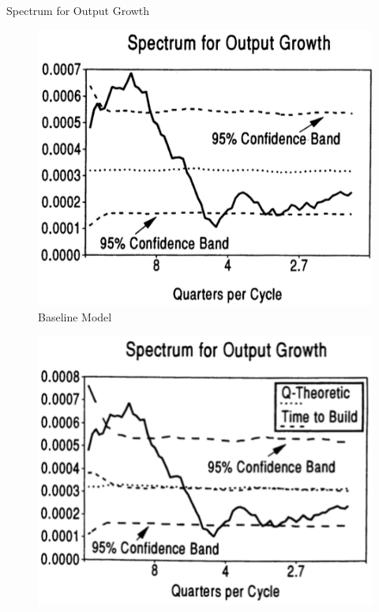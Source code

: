 \documentclass[10pt]{beamer}
\begin{document}
\begin{frame}{Spectrum for Output Growth}  
\begin{minipage}{0.33\textwidth}
\begin{figure}
  \centering
  \includegraphics[width=\linewidth]{Base_spect.png}
  \caption{Baseline Model}
\end{figure}
\end{minipage}%
\begin{minipage}{0.33\textwidth}
\begin{figure}
  \centering
  \includegraphics[width=\linewidth]{K_spect.png}

\end{figure}
\end{minipage}
\end{frame}
\end{document}
